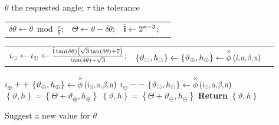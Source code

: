 \begin{algorithm}[H]
 \begin{algorithmic}
  \State \phantom{Require}  { $\theta$ the requested angle; \quad \quad $\tau$ the tolerance}
 \State  \begin{tabular*}{\textwidth}{c @{\extracolsep{\fill}} lll}
 $\delta\theta \gets \theta \bmod{\frac{\pi}{6} }$; & $\Theta \gets \theta - \delta\theta$;  &  $\overline{\mathbf{i}} \gets  2^{n-3} $;
 \end{tabular*}
  \State  \begin{tabular*}{\textwidth}{c @{\extracolsep{\fill}} ll}
  $i_{\circleddash} \gets i_{\oplus} \gets \frac{\overline{\mathbf{i}} \tan (\delta \theta ) \left(\sqrt{3} \tan (\delta \theta )+7\right)}{\tan (\delta \theta )+\sqrt{3}} $; & 
  $  \left\{ \vartheta_{\circleddash}, h_{\circleddash} \right\} \gets \left\{ \vartheta_{\oplus}, h_{\oplus} \right\} \gets \thetaX{i, \alpha, \beta, n}$
  \end{tabular*}
 \State  $i_{\oplus}++$ \;
 \State  $\left\{ \vartheta_{\oplus}, h_{\oplus}\right\} \gets \thetaX{i_{\oplus}, \alpha, \beta, n}$
 \EndWhile
  \State   $i_{\circleddash}--$ \;
  \State  $\left\{ \vartheta_{\circleddash}, h_{\circleddash}\right\} \gets \thetaX{i_{\circleddash}, \alpha, \beta, n}$
 \EndWhile
  \If{ $\vartheta_{\oplus} -\delta\theta < \delta\theta - \vartheta_{\circleddash}$ }
 \State  $\left\{ \vartheta, h\right\}  = \left\{\Theta + \vartheta_{\oplus}, h_{\oplus}\right\}  $ 
 \Else
  \State $\left\{ \vartheta, h\right\}  = \left\{\Theta + \vartheta_{\circleddash}, h_{\circleddash}\right\} $
  \EndIf
 \State \textbf{Return} {$\left\{ \vartheta, h\right\} $ }
  \end{algorithmic}
    \caption{Suggest a new value for $\theta$}
    \label{algo:newTheta}
 \end{algorithm}
 


